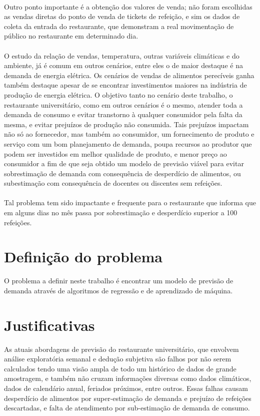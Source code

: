 \documentclass[	12pt, Times, openright, twoside, a4paper, english, brazil]{abntex2}
\begin{document}
        \paragraph*{} Outro ponto importante é a obtenção dos valores de venda; não foram escolhidas as vendas diretas do ponto de venda de tickets de refeição, e sim os dados de coleta da entrada do restaurante, que demonstram a real movimentação de público no restaurante em determinado dia.

        \paragraph*{} O estudo da relação de vendas, temperatura, outras variáveis climáticas e do ambiente, já é comum em outros cenários, entre eles o de maior destaque é na demanda de energia elétrica. Os cenários de vendas de alimentos perecíveis ganha também destaque apesar de se encontrar investimentos maiores na indústria de produção de energia elétrica. O objetivo tanto no cenário deste trabalho, o restaurante universitário, como em outros cenários é o mesmo, atender toda a demanda de consumo e evitar transtorno à qualquer consumidor pela falta da mesma, e evitar prejuízos de produção não consumida. Tais prejuízos impactam não só ao fornecedor, mas também ao consumidor, um fornecimento de produto e serviço com um bom planejamento de demanda, poupa recursos ao produtor que podem ser investidos em melhor qualidade de produto, e menor preço ao consumidor a fim de que seja obtido um modelo de previsão viável para evitar sobrestimação de demanda com consequência de desperdício de alimentos, ou subestimação com consequência de docentes ou discentes sem refeições. 

        \paragraph*{} Tal problema tem sido impactante e frequente para o restaurante que informa que em alguns
        dias no mês passa por sobrestimação e desperdício superior a 100 refeições. 

      \section{Definição do problema}
        O problema a definir neste trabalho é encontrar um modelo de previsão de demanda através de algoritmos de regressão e de aprendizado de máquina.

      \section{Justificativas}
        As atuais abordagens de previsão do restaurante universitário, que envolvem análise exploratória semanal e dedução subjetiva são falhos por não serem calculados tendo uma visão ampla de todo um histórico de dados de grande amostragem, e também não cruzam informações diversas como dados climáticos, dados de calendário anual, feriados próximos, entre outros. Essas falhas causam desperdício de alimentos por super-estimação de demanda e prejuízo de refeições descartadas, e falta de atendimento por sub-estimação de demanda de consumo.
\end{document}

